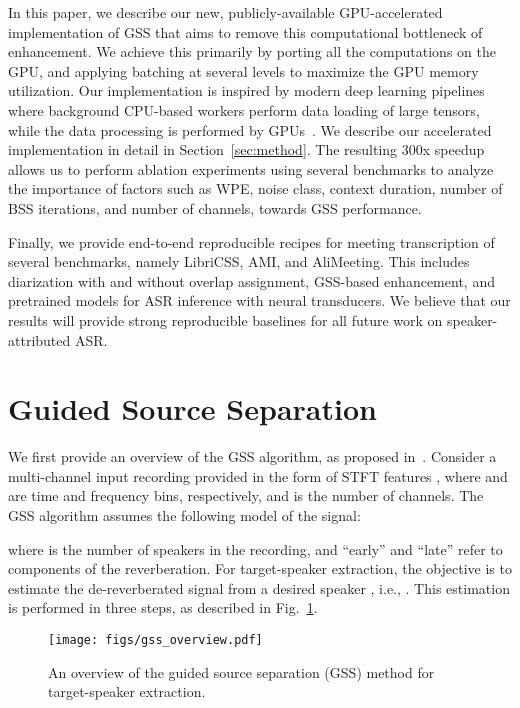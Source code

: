 \documentclass[a4paper]{article}
\begin{document}
In this paper, we describe our new, publicly-available GPU-accelerated implementation of GSS that aims to remove this computational bottleneck of enhancement. We achieve this primarily by porting all the computations on the GPU, and applying batching at several levels to maximize the GPU memory utilization. Our implementation is inspired by modern deep learning pipelines where background CPU-based workers perform data loading of large tensors, while the data processing is performed by GPUs~\cite{Paszke2019PyTorchAI}. We describe our accelerated implementation in detail in Section~\ref{sec:method}. The resulting 300x speedup allows us to perform ablation experiments using several benchmarks to analyze the importance of factors such as WPE, noise class, context duration, number of BSS iterations, and number of channels, towards GSS performance.

Finally, we provide end-to-end reproducible recipes for meeting transcription of several benchmarks, namely LibriCSS, AMI, and AliMeeting. This includes diarization with and without overlap assignment, GSS-based enhancement, and pretrained models for ASR inference with neural transducers. We believe that our results will provide strong reproducible baselines for all future work on speaker-attributed ASR.

\section{Guided Source Separation}
\label{sec:gss}

We first provide an overview of the GSS algorithm, as proposed in~\cite{Boeddeker2018FrontendPF}. Consider a multi-channel input recording provided in the form of STFT features , where  and  are time and frequency bins, respectively, and  is the number of channels. The GSS algorithm assumes the following model of the signal:


where  is the number of speakers in the recording, and ``early'' and ``late'' refer to components of the reverberation. For target-speaker extraction, the objective is to estimate the de-reverberated signal from a desired speaker , i.e., . This estimation is performed in three steps, as described in Fig.~\ref{fig:gss}.

\begin{figure}[t]
    \centering
    \texttt{[image: figs/gss\_overview.pdf]}
    \vspace{-0.8em}
    \caption{An overview of the guided source separation (GSS) method for target-speaker extraction.}
    \label{fig:gss}
\end{figure}
\end{document}
